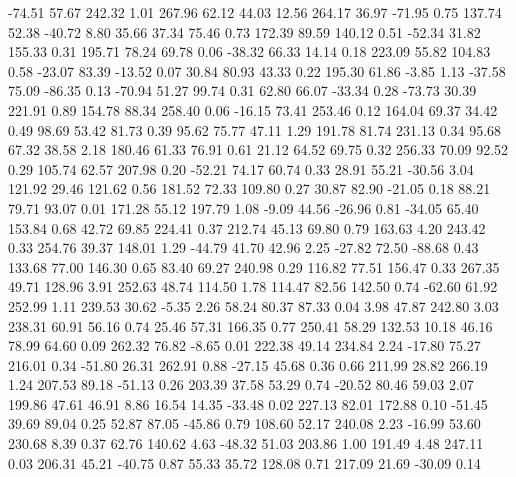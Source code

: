  -74.51   57.67  242.32    1.01
  267.96   62.12   44.03   12.56
  264.17   36.97  -71.95    0.75
  137.74   52.38  -40.72    8.80
   35.66   37.34   75.46    0.73
  172.39   89.59  140.12    0.51
  -52.34   31.82  155.33    0.31
  195.71   78.24   69.78    0.06
  -38.32   66.33   14.14    0.18
  223.09   55.82  104.83    0.58
  -23.07   83.39  -13.52    0.07
   30.84   80.93   43.33    0.22
  195.30   61.86   -3.85    1.13
  -37.58   75.09  -86.35    0.13
  -70.94   51.27   99.74    0.31
   62.80   66.07  -33.34    0.28
  -73.73   30.39  221.91    0.89
  154.78   88.34  258.40    0.06
  -16.15   73.41  253.46    0.12
  164.04   69.37   34.42    0.49
   98.69   53.42   81.73    0.39
   95.62   75.77   47.11    1.29
  191.78   81.74  231.13    0.34
   95.68   67.32   38.58    2.18
  180.46   61.33   76.91    0.61
   21.12   64.52   69.75    0.32
  256.33   70.09   92.52    0.29
  105.74   62.57  207.98    0.20
  -52.21   74.17   60.74    0.33
   28.91   55.21  -30.56    3.04
  121.92   29.46  121.62    0.56
  181.52   72.33  109.80    0.27
   30.87   82.90  -21.05    0.18
   88.21   79.71   93.07    0.01
  171.28   55.12  197.79    1.08
   -9.09   44.56  -26.96    0.81
  -34.05   65.40  153.84    0.68
   42.72   69.85  224.41    0.37
  212.74   45.13   69.80    0.79
  163.63    4.20  243.42    0.33
  254.76   39.37  148.01    1.29
  -44.79   41.70   42.96    2.25
  -27.82   72.50  -88.68    0.43
  133.68   77.00  146.30    0.65
   83.40   69.27  240.98    0.29
  116.82   77.51  156.47    0.33
  267.35   49.71  128.96    3.91
  252.63   48.74  114.50    1.78
  114.47   82.56  142.50    0.74
  -62.60   61.92  252.99    1.11
  239.53   30.62   -5.35    2.26
   58.24   80.37   87.33    0.04
    3.98   47.87  242.80    3.03
  238.31   60.91   56.16    0.74
   25.46   57.31  166.35    0.77
  250.41   58.29  132.53   10.18
   46.16   78.99   64.60    0.09
  262.32   76.82   -8.65    0.01
  222.38   49.14  234.84    2.24
  -17.80   75.27  216.01    0.34
  -51.80   26.31  262.91    0.88
  -27.15   45.68    0.36    0.66
  211.99   28.82  266.19    1.24
  207.53   89.18  -51.13    0.26
  203.39   37.58   53.29    0.74
  -20.52   80.46   59.03    2.07
  199.86   47.61   46.91    8.86
   16.54   14.35  -33.48    0.02
  227.13   82.01  172.88    0.10
  -51.45   39.69   89.04    0.25
   52.87   87.05  -45.86    0.79
  108.60   52.17  240.08    2.23
  -16.99   53.60  230.68    8.39
    0.37   62.76  140.62    4.63
  -48.32   51.03  203.86    1.00
  191.49    4.48  247.11    0.03
  206.31   45.21  -40.75    0.87
   55.33   35.72  128.08    0.71
  217.09   21.69  -30.09    0.14
